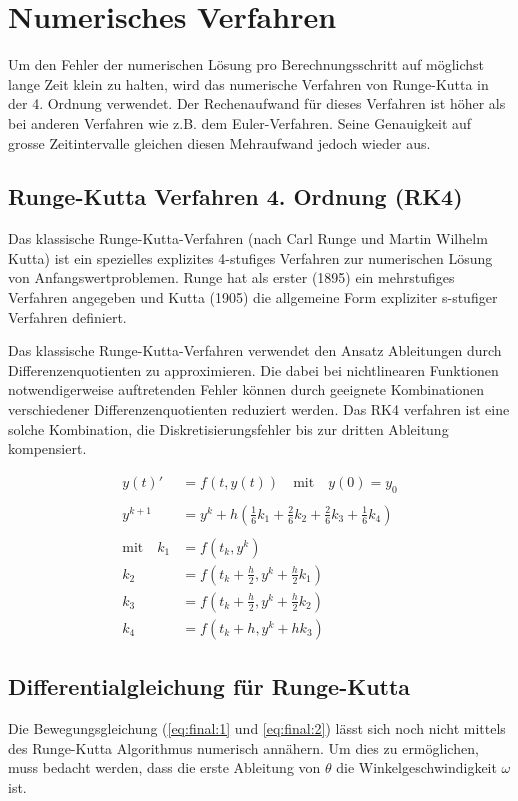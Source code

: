 \documentclass[12pt]{article}
\numberwithin{equation}{subsection}
\begin{document}
\newpage
\section{Numerisches Verfahren}
Um den Fehler der numerischen Lösung pro Berechnungsschritt auf möglichst lange Zeit klein zu halten, wird das numerische Verfahren von Runge-Kutta in der 4. Ordnung verwendet. Der Rechenaufwand für dieses Verfahren ist höher als bei anderen Verfahren wie z.B. dem Euler-Verfahren. Seine Genauigkeit auf grosse Zeitintervalle gleichen diesen Mehraufwand jedoch wieder aus.

\subsection{Runge-Kutta Verfahren 4. Ordnung (RK4)}
Das klassische Runge-Kutta-Verfahren (nach Carl Runge und Martin Wilhelm Kutta) ist ein spezielles explizites 4-stufiges Verfahren zur numerischen Lösung von Anfangswertproblemen. Runge hat als erster (1895) ein mehrstufiges Verfahren angegeben und Kutta (1905) die allgemeine Form expliziter s-stufiger Verfahren definiert.

Das klassische Runge-Kutta-Verfahren verwendet den Ansatz Ableitungen durch Differenzenquotienten zu approximieren. Die dabei bei nichtlinearen Funktionen notwendigerweise auftretenden Fehler können durch geeignete Kombinationen verschiedener Differenzenquotienten reduziert werden. Das RK4 verfahren ist eine solche Kombination, die Diskretisierungsfehler bis zur dritten Ableitung kompensiert.

\begin{align} \label{algo:rk}
	y(t)' &= f(t,y(t)) \quad \text{mit} \quad y(0) = y_0 \nonumber\\
	\nonumber\\
	y^{k+1} &= y^k + h \left(\frac{1}{6}k_1 + \frac{2}{6}k_2 + \frac{2}{6}k_3 + \frac{1}{6}k_4 \right)\\
	\nonumber\\
	\text{mit} \quad k_1 &= f(t_k, y^k) \nonumber\\
	k_2 &= f\left(t_k + \frac{h}{2}, y^k + \frac{h}{2}k_1 \right) \nonumber\\
	k_3 &= f\left(t_k + \frac{h}{2}, y^k + \frac{h}{2}k_2 \right) \nonumber\\
	k_4 &= f\left(t_k + h, y^k + h k_3 \right)\nonumber
\end{align}

\subsection{Differentialgleichung für Runge-Kutta}
Die Bewegungsgleichung (\ref{eq:final:1} und \ref{eq:final:2}) lässt sich noch nicht mittels des Runge-Kutta Algorithmus numerisch annähern. Um dies zu ermöglichen, muss bedacht werden, dass die erste Ableitung von $\theta$ die Winkelgeschwindigkeit $\omega$ ist.
\end{document}
